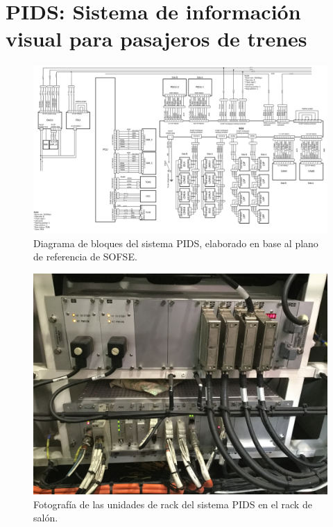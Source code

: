 \pagebreak
\section{PIDS: Sistema de información visual para pasajeros de trenes}

\begin{figure}[ht]
	\centering
	\includegraphics[width=1\textwidth]{./Figures/diagramaPIDS.png}
	\caption{Diagrama de bloques del sistema PIDS, elaborado en base al plano de referencia de SOFSE.}
	\label{fig:diagramaPIDS}
\end{figure}


\begin{figure}[ht]
	\centering
	\includegraphics[width=1\textwidth]{./Figures/rackPIDS1.JPG}
	\caption{Fotografía de las unidades de rack del sistema PIDS en el rack de salón.}
	\label{fig:rackPIDS1}
\end{figure}


